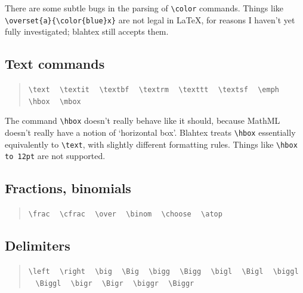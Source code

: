 \documentclass{article}
\newcommand{\texcommand}[1]{\textbackslash{}#1}
\newcommand{\spacer}{\,\,\, \hfil}
\newcommand{\lastspacer}{\hfill\hfill\hfill}
\newenvironment{mylist}{\begin{quote}}{\end{quote}}
\begin{document}
There are some subtle bugs in the parsing of \texttt{\texcommand{color}} commands. Things like \texttt{\texcommand{overset}\{a\}\{\texcommand{color}\{blue\}x\}} are not legal in \LaTeX, for reasons I haven't yet fully investigated; blahtex still accepts them.

\subsection{Text commands}

\begin{mylist}
\texttt{\texcommand{text}} \spacer
\texttt{\texcommand{textit}} \spacer
\texttt{\texcommand{textbf}} \spacer
\texttt{\texcommand{textrm}} \spacer
\texttt{\texcommand{texttt}} \spacer
\texttt{\texcommand{textsf}} \spacer
\texttt{\texcommand{emph}} \spacer
\texttt{\texcommand{hbox}} \spacer
\texttt{\texcommand{mbox}} \lastspacer
\end{mylist}

The command \texttt{\texcommand{hbox}} doesn't really behave like it should, because MathML doesn't really have a notion of `horizontal box'. Blahtex treats \texttt{\texcommand{hbox}} essentially equivalently to \texttt{\texcommand{text}}, with slightly different formatting rules. Things like \texttt{\texcommand{hbox} to 12pt} are not supported.

\subsection{Fractions, binomials}

\begin{mylist}
\texttt{\texcommand{frac}} \spacer
\texttt{\texcommand{cfrac}} \spacer
\texttt{\texcommand{over}} \spacer
\texttt{\texcommand{binom}} \spacer
\texttt{\texcommand{choose}} \spacer
\texttt{\texcommand{atop}} \lastspacer
\end{mylist}

\subsection{Delimiters}

\begin{mylist}
\texttt{\texcommand{left}} \spacer
\texttt{\texcommand{right}} \spacer
\texttt{\texcommand{big}} \spacer
\texttt{\texcommand{Big}} \spacer
\texttt{\texcommand{bigg}} \spacer
\texttt{\texcommand{Bigg}} \spacer
\texttt{\texcommand{bigl}} \spacer
\texttt{\texcommand{Bigl}} \spacer
\texttt{\texcommand{biggl}} \spacer
\texttt{\texcommand{Biggl}} \spacer
\texttt{\texcommand{bigr}} \spacer
\texttt{\texcommand{Bigr}} \spacer
\texttt{\texcommand{biggr}} \spacer
\texttt{\texcommand{Biggr}} \lastspacer
\end{mylist}
\end{document}
